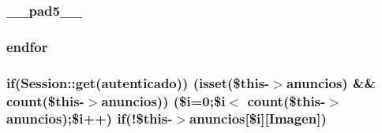 \subsubsection[{\+\_\+\+\_\+pad5\+\_\+\+\_\+}]{ \+\_\+\+\_\+pad5\+\_\+\+\_\+}\label{app_2views_2index_2index_8php_a7c49bc58fb30f37aad799fdeb4877a8b}
\hypertarget{app_2views_2index_2index_8php_ae8fdc27183f296411bac00ed522ee1ac}{}
\subsubsection[{endfor}]{\setlength{\rightskip}{0pt plus 5cm}endfor}\label{app_2views_2index_2index_8php_ae8fdc27183f296411bac00ed522ee1ac}
\hypertarget{app_2views_2index_2index_8php_a3d726968fd3dc3d64cac837a26187799}{}
\subsubsection[{if}]{\setlength{\rightskip}{0pt plus 5cm}if({\bf Session\+::get}(\textquotesingle{}autenticado\textquotesingle{})) (isset(\$this-\/$>$anuncios) \&\& count(\$this-\/$>$anuncios)) (\$i=0;\$i$<$ count(\$this-\/$>$anuncios);\$i++) if(!\$this-\/$>$anuncios\mbox{[}\$i\mbox{]}\mbox{[}\textquotesingle{}Imagen\textquotesingle{}\mbox{]})}\label{app_2views_2index_2index_8php_a3d726968fd3dc3d64cac837a26187799}
